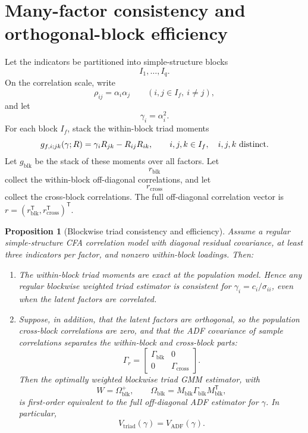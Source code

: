 \documentclass[11pt]{article}
\newcommand{\T}{^{\mathsf T}}
\theoremstyle{plain}
\newtheorem{proposition}{Proposition}
\theoremstyle{remark}
\begin{document}
\section{Many-factor consistency and orthogonal-block efficiency}

Let the indicators be partitioned into simple-structure blocks
\[
  I_1,\ldots,I_q .
\]
On the correlation scale, write
\[
  \rho_{ij}=\alpha_i\alpha_j
  \qquad(i,j\in I_f,\ i\ne j),
\]
and let
\[
  \gamma_i=\alpha_i^2 .
\]
For each block \(I_f\), stack the within-block triad moments
\[
  g_{f,i;jk}(\gamma;R)
  =
  \gamma_iR_{jk}-R_{ij}R_{ik},
  \qquad
  i,j,k\in I_f,\quad i,j,k\hbox{ distinct}.
\]
Let \(g_{\mathrm{blk}}\) be the stack of these moments over all factors. Let
\[
  r_{\mathrm{blk}}
\]
collect the within-block off-diagonal correlations, and let
\[
  r_{\mathrm{cross}}
\]
collect the cross-block correlations. The full off-diagonal correlation vector
is \(r=(r_{\mathrm{blk}}\T,r_{\mathrm{cross}}\T)\T\).

\begin{proposition}[Blockwise triad consistency and efficiency]
\label{prop:blockwise-triad-efficiency}
Assume a regular simple-structure CFA correlation model with diagonal residual
covariance, at least three indicators per factor, and nonzero within-block
loadings. Then:
\begin{enumerate}
\item The within-block triad moments are exact at the population model.
  Hence any regular blockwise weighted triad estimator is consistent for
  \(\gamma_i=c_i/\sigma_{ii}\), even when the latent factors are correlated.
\item Suppose, in addition, that the latent factors are orthogonal, so the
  population cross-block correlations are zero, and that the ADF covariance of
  sample correlations separates the within-block and cross-block parts:
  \[
    \Gamma_r
    =
    \begin{bmatrix}
      \Gamma_{\mathrm{blk}} & 0\\
      0 & \Gamma_{\mathrm{cross}}
    \end{bmatrix}.
  \]
  Then the optimally weighted blockwise triad GMM estimator, with
  \[
    W=\Omega_{\mathrm{blk}}^{+},
    \qquad
    \Omega_{\mathrm{blk}}
    =
    M_{\mathrm{blk}}\Gamma_{\mathrm{blk}}M_{\mathrm{blk}}\T,
  \]
  is first-order equivalent to the full off-diagonal ADF estimator for
  \(\gamma\). In particular,
  \[
    V_{\mathrm{triad}}(\gamma)=V_{\mathrm{ADF}}(\gamma).
  \]
\end{enumerate}
\end{proposition}
\end{document}
